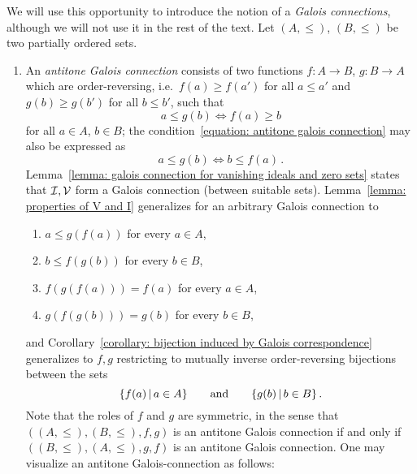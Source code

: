 \begin{remark}
  \label{remark: galois connection}
  We will use this opportunity to introduce the notion of a \emph{Galois connections}, although we will not use it in the rest of the text.
  Let $(A,\leq)$, $(B, \leq)$ be two partially ordered sets.
  \begin{enumerate}
    \item
      An \emph{antitone Galois connection} consists of two functions $f \colon A \to B$, $g \colon B \to A$ which are order-reversing, i.e.\ $f(a) \geq f(a')$ for all $a \leq a'$ and $g(b) \geq g(b')$ for all $b \leq b'$, such that
      \begin{equation}
        \label{equation: antitone galois connection}
              a \leq g(b)
        \iff  f(a) \geq b
      \end{equation}
      for all $a \in A$, $b \in B$;
      the condition~\eqref{equation: antitone galois connection} may also be expressed as
      \[
              a \leq g(b)
        \iff  b \leq f(a) \,.
      \]
      Lemma~\ref{lemma: galois connection for vanishing ideals and zero sets} states that $\mathcal{I}, \mathcal{V}$ form a Galois connection (between suitable sets).
      Lemma~\ref{lemma: properties of V and I} generalizes for an arbitrary Galois connection to
      \begin{enumerate}[label = \alph*')]
        \item
          \label{enumerate: gf is monotone}
          $a \leq g(f(a))$ for every $a \in A$,
        \item
          \label{enumerate: fg is monotone}
          $b \leq f(g(b))$ for every $b \in B$,
        \item
          \label{enumerate: fgf = f}
          $f(g(f(a))) = f(a)$ for every $a \in A$,
        \item
          \label{enumerate: gfg = g}
          $g(f(g(b))) = g(b)$ for every $b \in B$,
      \end{enumerate}
      and Corollary~\ref{corollary: bijection induced by Galois correspondence} generalizes to $f, g$ restricting to mutually inverse order-re\-ver\-sing bijections between the sets
      \[
        \{ f(a) \suchthat a \in A \}
        \qquad\text{and}\qquad
        \{ g(b) \suchthat b \in B \} \,.
      \]
      Note that the roles of $f$ and $g$ are symmetric, in the sense that $((A, \leq), (B, \leq), f, g)$ is an antitone Galois connection if and only if $((B, \leq), (A, \leq), g, f)$ is an antitone Galois connection.
      One may visualize an antitone Galois-connection as follows:

\end{enumerate}
\end{remark}
